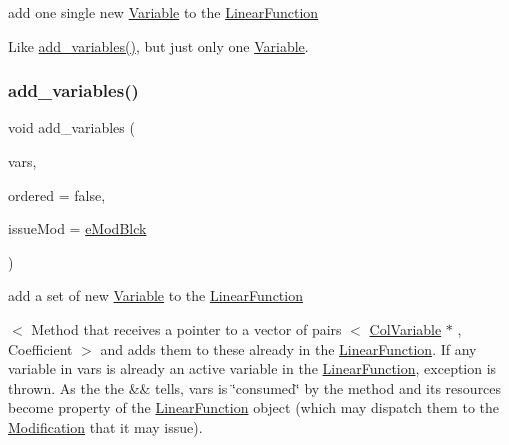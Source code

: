 add one single new \mbox{\hyperlink{class_s_m_spp__di__unipi__it_1_1_variable}{Variable}} to the \mbox{\hyperlink{class_s_m_spp__di__unipi__it_1_1_linear_function}{Linear\+Function}} 

Like \mbox{\hyperlink{class_s_m_spp__di__unipi__it_1_1_linear_function_af5b5ea0e76a8726a602d6134dda294d0}{add\+\_\+variables()}}, but just only one \mbox{\hyperlink{class_s_m_spp__di__unipi__it_1_1_variable}{Variable}}. \mbox{\label{class_s_m_spp__di__unipi__it_1_1_linear_function_af5b5ea0e76a8726a602d6134dda294d0}} 
\subsubsection{\texorpdfstring{add\+\_\+variables()}{add\_variables()}}
{\footnotesize\ttfamily void add\+\_\+variables (\begin{DoxyParamCaption}\item[{\mbox{\hyperlink{class_s_m_spp__di__unipi__it_1_1_linear_function_aee8988faa66c7c9013613e2c76580ddf}{v\+\_\+coeff\+\_\+pair}} \&\&}]{vars,  }\item[{const bool}]{ordered = {\ttfamily false},  }\item[{\mbox{\hyperlink{group___modification___t_y_p_e_s_ga544246d8c462e9a2d817c2c30797968f}{c\+\_\+\+Mod\+Param}}}]{issue\+Mod = {\ttfamily \mbox{\hyperlink{group___modification___t_y_p_e_s_gga48fddcdd03a03f49b7e389ca1ed938d4a21b14b26b1c0093a0905f6fc010bad29}{e\+Mod\+Blck}}} }\end{DoxyParamCaption})}



add a set of new \mbox{\hyperlink{class_s_m_spp__di__unipi__it_1_1_variable}{Variable}} to the \mbox{\hyperlink{class_s_m_spp__di__unipi__it_1_1_linear_function}{Linear\+Function}} 

$<$ Method that receives a pointer to a vector of pairs $<$ \mbox{\hyperlink{class_s_m_spp__di__unipi__it_1_1_col_variable}{Col\+Variable}} $\ast$ , Coefficient $>$ and adds them to these already in the \mbox{\hyperlink{class_s_m_spp__di__unipi__it_1_1_linear_function}{Linear\+Function}}. If any variable in vars is already an active variable in the \mbox{\hyperlink{class_s_m_spp__di__unipi__it_1_1_linear_function}{Linear\+Function}}, exception is thrown. As the the \&\& tells, vars is \char`\"{}consumed\char`\"{} by the method and its resources become property of the \mbox{\hyperlink{class_s_m_spp__di__unipi__it_1_1_linear_function}{Linear\+Function}} object (which may dispatch them to the \mbox{\hyperlink{class_s_m_spp__di__unipi__it_1_1_modification}{Modification}} that it may issue).

